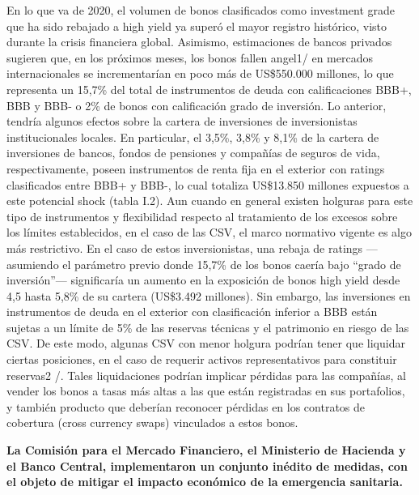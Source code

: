 \documentclass[
]{book}
\begin{document}
En lo que va de 2020, el volumen de bonos clasificados como investment grade
que ha sido rebajado a high yield ya superó el mayor registro histórico, visto
durante la crisis financiera global. Asimismo, estimaciones de bancos privados
sugieren que, en los próximos meses, los bonos fallen angel1/ en mercados
internacionales se incrementarían en poco más de US\$550.000 millones, lo
que representa un 15,7\% del total de instrumentos de deuda con calificaciones
BBB+, BBB y BBB- o 2\% de bonos con calificación grado de inversión.
Lo anterior, tendría algunos efectos sobre la cartera de inversiones de
inversionistas institucionales locales. En particular, el 3,5\%, 3,8\% y 8,1\% de la
cartera de inversiones de bancos, fondos de pensiones y compañías de seguros
de vida, respectivamente, poseen instrumentos de renta fija en el exterior con
ratings clasificados entre BBB+ y BBB-, lo cual totaliza US\$13.850 millones
expuestos a este potencial shock (tabla I.2).
Aun cuando en general existen holguras para este tipo de instrumentos y
flexibilidad respecto al tratamiento de los excesos sobre los límites establecidos,
en el caso de las CSV, el marco normativo vigente es algo más restrictivo. En el
caso de estos inversionistas, una rebaja de ratings ---asumiendo el parámetro
previo donde 15,7\% de los bonos caería bajo ``grado de inversión''--- significaría
un aumento en la exposición de bonos high yield desde 4,5 hasta 5,8\% de su
cartera (US\$3.492 millones). Sin embargo, las inversiones en instrumentos de
deuda en el exterior con clasificación inferior a BBB están sujetas a un límite de
5\% de las reservas técnicas y el patrimonio en riesgo de las CSV.
De este modo, algunas CSV con menor holgura podrían tener que liquidar
ciertas posiciones, en el caso de requerir activos representativos para constituir
reservas2
/. Tales liquidaciones podrían implicar pérdidas para las compañías, al
vender los bonos a tasas más altas a las que están registradas en sus portafolios,
y también producto que deberían reconocer pérdidas en los contratos de
cobertura (cross currency swaps) vinculados a estos bonos.

\textbf{La Comisión para el Mercado Financiero, el Ministerio de Hacienda y el Banco Central, implementaron un conjunto inédito de medidas, con el objeto de mitigar el impacto económico de la emergencia sanitaria.}
\end{document}
